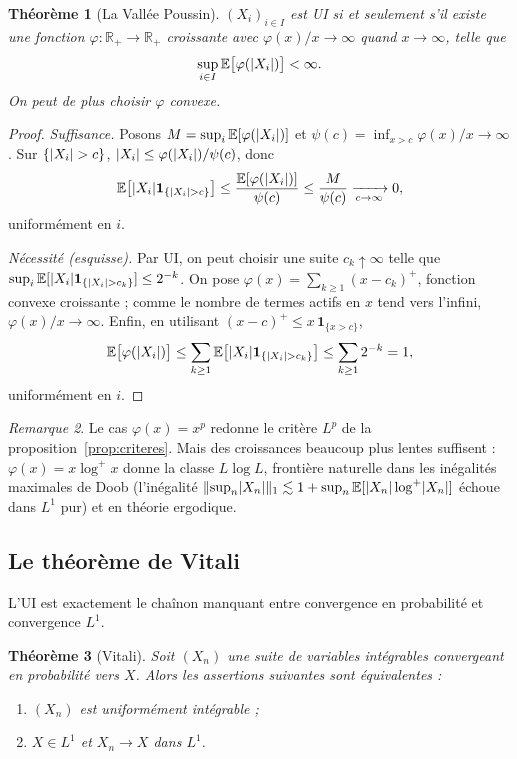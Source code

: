 \documentclass[11pt,a4paper]{article}
\theoremstyle{plain}
\newtheorem{theorem}{Théorème}[section]
\theoremstyle{definition}
\theoremstyle{remark}
\newtheorem{remark}[theorem]{Remarque}
\newcommand{\E}{\mathbb{E}}
\newcommand{\R}{\mathbb{R}}
\newcommand{\ind}{\mathbf{1}}
\DeclarePairedDelimiter{\abs}{\lvert}{\rvert}
\DeclarePairedDelimiter{\norm}{\lVert}{\rVert}
\begin{document}
\begin{theorem}[La Vallée Poussin]\label{thm:LVP}
$(X_i)_{i\in I}$ est UI si et seulement s'il existe une fonction
$\varphi : \R_+ \to \R_+$ croissante avec
$\varphi(x)/x \to \infty$ quand $x \to \infty$, telle que
\[
\sup_{i\in I} \E\bigl[\varphi(\abs{X_i})\bigr] < \infty.
\]
On peut de plus choisir $\varphi$ convexe.
\end{theorem}

\begin{proof}
\emph{Suffisance.} Posons $M = \sup_i \E[\varphi(\abs{X_i})]$ et
$\psi(c) = \inf_{x > c} \varphi(x)/x \to \infty$. Sur $\{\abs{X_i} > c\}$,
$\abs{X_i} \le \varphi(\abs{X_i})/\psi(c)$, donc
\[
\E\bigl[\abs{X_i}\ind_{\{\abs{X_i}>c\}}\bigr]
\le \frac{\E[\varphi(\abs{X_i})]}{\psi(c)} \le \frac{M}{\psi(c)}
\xrightarrow[c\to\infty]{} 0,
\]
uniformément en $i$.

\emph{Nécessité (esquisse).} Par UI, on peut choisir une suite
$c_k \uparrow \infty$ telle que
$\sup_i \E[\abs{X_i}\ind_{\{\abs{X_i}>c_k\}}] \le 2^{-k}$. On pose
$\varphi(x) = \sum_{k\ge1} (x - c_k)^+$, fonction convexe croissante ; comme le
nombre de termes actifs en $x$ tend vers l'infini, $\varphi(x)/x \to \infty$.
Enfin, en utilisant $(x-c)^+ \le x\,\ind_{\{x > c\}}$,
\[
\E\bigl[\varphi(\abs{X_i})\bigr]
\le \sum_{k\ge1} \E\bigl[\abs{X_i}\ind_{\{\abs{X_i}>c_k\}}\bigr]
\le \sum_{k\ge1} 2^{-k} = 1,
\]
uniformément en $i$.
\end{proof}

\begin{remark}
Le cas $\varphi(x) = x^p$ redonne le critère $L^p$ de la
proposition~\ref{prop:criteres}. Mais des croissances beaucoup plus lentes
suffisent : $\varphi(x) = x \log^+ x$ donne la classe $L\log L$, frontière
naturelle dans les inégalités maximales de Doob (l'inégalité
$\norm{\sup_n \abs{X_n}}_1 \lesssim 1 + \sup_n \E[\abs{X_n}\log^+\abs{X_n}]$
échoue dans $L^1$ pur) et en théorie ergodique.
\end{remark}

\subsection{Le théorème de Vitali}

L'UI est exactement le chaînon manquant entre convergence en probabilité et
convergence $L^1$.

\begin{theorem}[Vitali]\label{thm:vitali}
Soit $(X_n)$ une suite de variables intégrables convergeant en probabilité vers
$X$. Alors les assertions suivantes sont équivalentes :
\begin{enumerate}[label=(\roman*)]
\item $(X_n)$ est uniformément intégrable ;
\item $X \in L^1$ et $X_n \to X$ dans $L^1$.
\end{enumerate}
\end{theorem}
\end{document}

